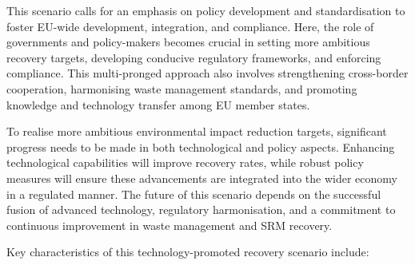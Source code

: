 This scenario calls for an emphasis on policy development and standardisation to foster EU-wide development, integration, and compliance. Here, the role of governments and policy-makers becomes crucial in setting more ambitious recovery targets, developing conducive regulatory frameworks, and enforcing compliance. This multi-pronged approach also involves strengthening cross-border cooperation, harmonising waste management standards, and promoting knowledge and technology transfer among EU member states.

To realise more ambitious environmental impact reduction targets, significant progress needs to be made in both technological and policy aspects. Enhancing technological capabilities will improve recovery rates, while robust policy measures will ensure these advancements are integrated into the wider economy in a regulated manner. The future of this scenario depends on the successful fusion of advanced technology, regulatory harmonisation, and a commitment to continuous improvement in waste management and SRM recovery.

Key characteristics of this technology-promoted recovery scenario include:

